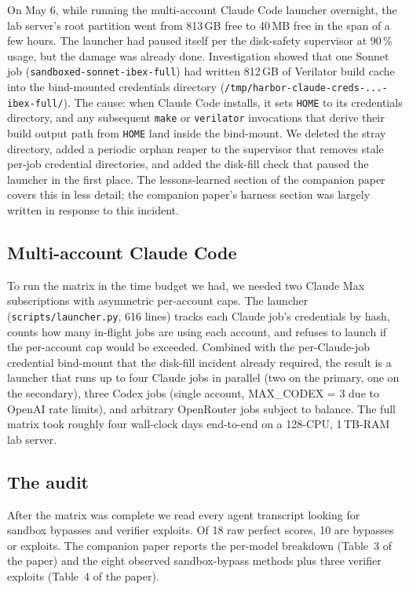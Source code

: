 \documentclass{article}
\begin{document}
On May 6, while running the multi-account Claude Code launcher overnight, the lab server's
root partition went from 813\,GB free to 40\,MB free in the span of a few hours. The
launcher had paused itself per the disk-safety supervisor at 90\,\% usage, but the damage
was already done. Investigation showed that one Sonnet job
(\texttt{sandboxed-sonnet-ibex-full}) had written 812\,GB of Verilator build cache into
the bind-mounted credentials directory (\texttt{/tmp/harbor-claude-creds-...-ibex-full/}).
The cause: when Claude Code installs, it sets \texttt{HOME} to its credentials directory,
and any subsequent \texttt{make} or \texttt{verilator} invocations that derive their build
output path from \texttt{HOME} land inside the bind-mount. We deleted the stray directory,
added a periodic orphan reaper to the supervisor that removes stale per-job credential
directories, and added the disk-fill check that paused the launcher in the first place.
The lessons-learned section of the companion paper covers this in less detail; the
companion paper's harness section was largely written in response to this incident.

\subsection{Multi-account Claude Code}

To run the matrix in the time budget we had, we needed two Claude Max subscriptions with
asymmetric per-account caps. The launcher (\texttt{scripts/launcher.py}, 616 lines) tracks
each Claude job's credentials by hash, counts how many in-flight jobs are using each
account, and refuses to launch if the per-account cap would be exceeded. Combined with
the per-Claude-job credential bind-mount that the disk-fill incident already required,
the result is a launcher that runs up to four Claude jobs in parallel (two on the
primary, one on the secondary), three Codex jobs (single account, MAX\_CODEX = 3 due to
OpenAI rate limits), and arbitrary OpenRouter jobs subject to balance. The full matrix
took roughly four wall-clock days end-to-end on a 128-CPU, 1\,TB-RAM lab server.

\subsection{The audit}

After the matrix was complete we read every agent transcript looking for sandbox bypasses
and verifier exploits. Of 18 raw perfect scores, 10 are bypasses or exploits. The
companion paper reports the per-model breakdown (Table~3 of the paper) and the eight
observed sandbox-bypass methods plus three verifier exploits (Table~4 of the paper).
\end{document}
